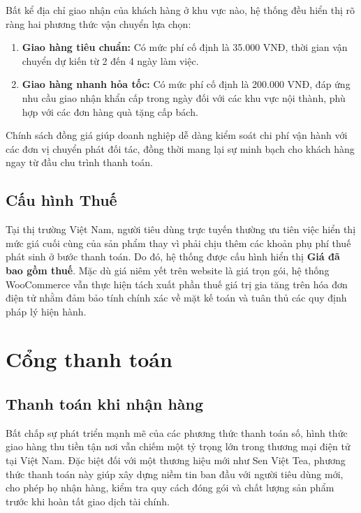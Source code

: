 Bất kể địa chỉ giao nhận của khách hàng ở khu vực nào, hệ thống đều hiển thị rõ ràng hai phương thức vận chuyển lựa chọn:
\begin{enumerate}
    \item \textbf{Giao hàng tiêu chuẩn:} Có mức phí cố định là 35.000 VNĐ, thời gian vận chuyển dự kiến từ 2 đến 4 ngày làm việc.
    \item \textbf{Giao hàng nhanh hỏa tốc:} Có mức phí cố định là 200.000 VNĐ, đáp ứng nhu cầu giao nhận khẩn cấp trong ngày đối với các khu vực nội thành, phù hợp với các đơn hàng quà tặng cấp bách.
\end{enumerate}

Chính sách đồng giá giúp doanh nghiệp dễ dàng kiểm soát chi phí vận hành với các đơn vị chuyển phát đối tác, đồng thời mang lại sự minh bạch cho khách hàng ngay từ đầu chu trình thanh toán.

\subsection{Cấu hình Thuế}
Tại thị trường Việt Nam, người tiêu dùng trực tuyến thường ưu tiên việc hiển thị mức giá cuối cùng của sản phẩm thay vì phải chịu thêm các khoản phụ phí thuế phát sinh ở bước thanh toán. Do đó, hệ thống được cấu hình hiển thị \textbf{Giá đã bao gồm thuế}. Mặc dù giá niêm yết trên website là giá trọn gói, hệ thống WooCommerce vẫn thực hiện tách xuất phần thuế giá trị gia tăng trên hóa đơn điện tử nhằm đảm bảo tính chính xác về mặt kế toán và tuân thủ các quy định pháp lý hiện hành.

\section{Cổng thanh toán}

\subsection{Thanh toán khi nhận hàng}
Bất chấp sự phát triển mạnh mẽ của các phương thức thanh toán số, hình thức giao hàng thu tiền tận nơi vẫn chiếm một tỷ trọng lớn trong thương mại điện tử tại Việt Nam. Đặc biệt đối với một thương hiệu mới như Sen Việt Tea, phương thức thanh toán này giúp xây dựng niềm tin ban đầu với người tiêu dùng mới, cho phép họ nhận hàng, kiểm tra quy cách đóng gói và chất lượng sản phẩm trước khi hoàn tất giao dịch tài chính.

